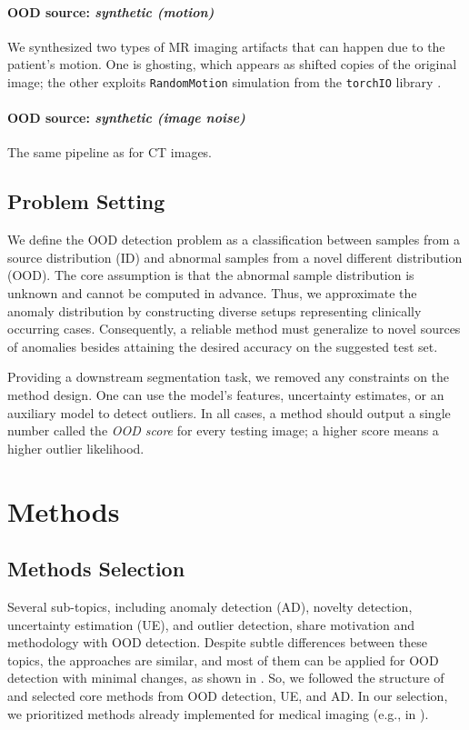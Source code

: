 \paragraph{OOD source: \textit{synthetic (motion)}}
We synthesized two types of MR imaging artifacts that can happen due to the patient's motion. One is ghosting, which appears as shifted copies of the original image; the other exploits \texttt{RandomMotion} simulation from the \texttt{torchIO} library \cite{torchio}.


\paragraph{OOD source: \textit{synthetic (image noise)}}
The same pipeline as for CT images.


\subsection{Problem Setting}

We define the OOD detection problem as a classification between samples from a source distribution (ID) and abnormal samples from a novel different distribution (OOD). The core assumption is that the abnormal sample distribution is unknown and cannot be computed in advance. Thus, we approximate the anomaly distribution by constructing diverse setups representing clinically occurring cases. Consequently, a reliable method must generalize to novel sources of anomalies besides attaining the desired accuracy on the suggested test set.

Providing a downstream segmentation task, we removed any constraints on the method design. One can use the model's features, uncertainty estimates, or an auxiliary model to detect outliers. In all cases, a method should output a single number called the \textit{OOD score} for every testing image; a higher score means a higher outlier likelihood.


\section{Methods}

\subsection{Methods Selection}

Several sub-topics, including anomaly detection (AD), novelty detection, uncertainty estimation (UE), and outlier detection, share motivation and methodology with OOD detection. Despite subtle differences between these topics, the approaches are similar, and most of them can be applied for OOD detection with minimal changes, as shown in \cite{yang2022openood}. So, we followed the structure of \cite{yang2022openood} and selected core methods from OOD detection, UE, and AD. In our selection, we prioritized methods already implemented for medical imaging (e.g., in \cite{karimi2022improving,jungo2019assessing,zimmerer2022mood}).

